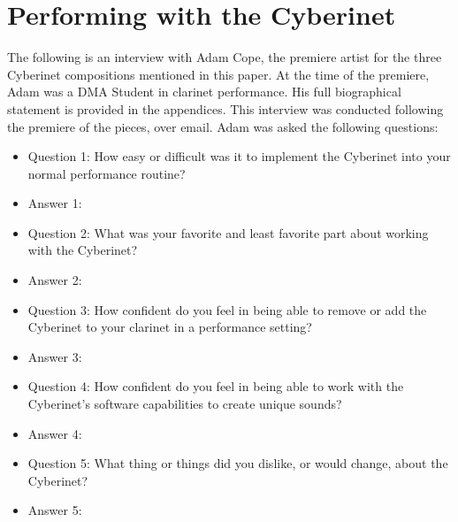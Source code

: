 \section{Performing with the Cyberinet}
The following is an interview with Adam Cope, the premiere artist for the three Cyberinet compositions mentioned in this paper. At the time of the premiere, Adam was a DMA Student in clarinet performance. His full biographical statement is provided in the appendices. This interview was conducted following the premiere of the pieces, over email. Adam was asked the following questions:

\begin{itemize}
    \item Question 1: How easy or difficult was it to implement the Cyberinet into your normal performance routine?
    \item Answer 1:
    \item Question 2: What was your favorite and least favorite part about working with the Cyberinet?
    \item Answer 2: 
    \item Question 3: How confident do you feel in being able to remove or add the Cyberinet to your clarinet in a performance setting?
    \item Answer 3:
    \item Question 4: How confident do you feel in being able to work with the Cyberinet's software capabilities to create unique sounds?
    \item Answer 4:
    \item Question 5: What thing or things did you dislike, or would change, about the Cyberinet?
    \item Answer 5:
\end{itemize}




